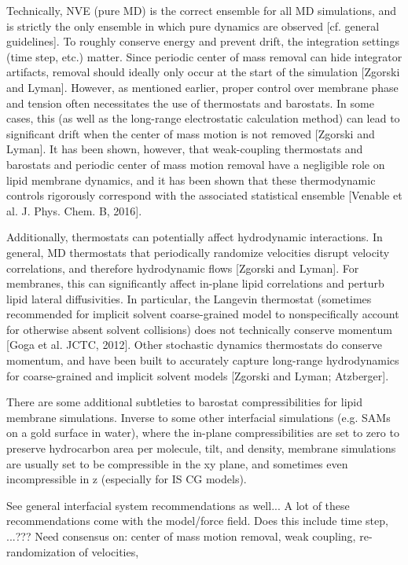 \documentclass[9pt,bestpractices]{livecoms}
\begin{document}
Technically, NVE (pure MD) is the correct ensemble for all MD simulations, and is strictly the only ensemble in which pure dynamics are observed [cf. general guidelines].
To roughly conserve energy and prevent drift, the integration settings (time step, etc.) matter.
Since periodic center of mass removal can hide integrator artifacts, removal should ideally only occur at the start of the simulation [Zgorski and Lyman].
However, as mentioned earlier, proper control over membrane phase and tension often necessitates the use of thermostats and barostats.
In some cases, this (as well as the long-range electrostatic calculation method) can lead to significant drift when the center of mass motion is not removed [Zgorski and Lyman].
It has been shown, however, that weak-coupling thermostats and barostats and periodic center of mass motion removal have a negligible role on lipid membrane dynamics, and it has been shown that these thermodynamic controls rigorously correspond with the associated statistical ensemble [Venable et al. J. Phys. Chem. B, 2016].

Additionally, thermostats can potentially affect hydrodynamic interactions.
In general, MD thermostats that periodically randomize velocities disrupt velocity correlations, and therefore hydrodynamic flows [Zgorski and Lyman].
For membranes, this can significantly affect in-plane lipid correlations and perturb lipid lateral diffusivities.
In particular, the Langevin thermostat (sometimes recommended for implicit solvent coarse-grained model to nonspecifically account for otherwise absent solvent collisions) does not technically conserve momentum [Goga et al. JCTC, 2012].
Other stochastic dynamics thermostats do conserve momentum, and have been built to accurately capture long-range hydrodynamics for coarse-grained and implicit solvent models [Zgorski and Lyman; Atzberger].

There are some additional subtleties to barostat compressibilities for lipid membrane simulations.
Inverse to some other interfacial simulations (e.g. SAMs on a gold surface in water), where the in-plane compressibilities are set to zero to preserve hydrocarbon area per molecule, tilt, and density, membrane simulations are usually set to be compressible in the xy plane, and sometimes even incompressible in z (especially for IS CG models).

See general interfacial system recommendations as well...
A lot of these recommendations come with the model/force field.
Does this include time step, ...???
Need consensus on: center of mass motion removal, weak coupling, re-randomization of velocities,
\end{document}
